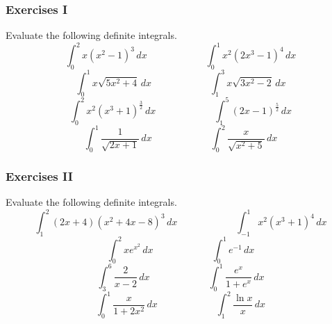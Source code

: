 \documentclass[xcolor=dvipsnames]{beamer}
\newcounter{exercise}
\begin{document}
\begin{frame}
  \frametitle{Exercises I}
Evaluate the following definite integrals.
\begin{equation}
  \label{eq:mauphouw}
  \int_{0}^{2}x(x^{2}-1)^{3}\,dx\hspace{1in}\int_{0}^{1}x^{2}(2x^{3}-1)^{4}\,dx
\end{equation}
\begin{equation}
  \label{eq:pahteeth}
  \int_{0}^{1}x\sqrt{5x^{2}+4}\,dx\hspace{1in}\int_{1}^{3}x\sqrt{3x^{2}-2}\,dx
\end{equation}
\begin{equation}
  \label{eq:ceiquoor}
  \int_{0}^{2}x^{2}(x^{3}+1)^{\frac{3}{2}}\,dx\hspace{1in}\int_{1}^{5}(2x-1)^{\frac{5}{2}}\,dx
\end{equation}
\begin{equation}
  \label{eq:riweevie}
  \int_{0}^{1}\frac{1}{\sqrt{2x+1}}\,dx\hspace{1in}\int_{0}^{2}\frac{x}{\sqrt{x^{2}+5}}\,dx
\end{equation}
\end{frame}

\begin{frame}
  \frametitle{Exercises II}
Evaluate the following definite integrals.
\begin{equation}
  \label{eq:aigighau}
  \int_{1}^{2}(2x+4)(x^{2}+4x-8)^{3}\,dx\hspace{1in}\int_{-1}^{1}x^{2}(x^{3}+1)^{4}\,dx
\end{equation}
\begin{equation}
  \label{eq:omixughu}
  \int_{0}^{2}xe^{x^{2}}\,dx\hspace{1in}\int_{0}^{1}e^{-1}\,dx
\end{equation}
\begin{equation}
  \label{eq:baemixeg}
  \int_{3}^{6}\frac{2}{x-2}\,dx\hspace{1in}\int_{0}^{1}\frac{e^{x}}{1+e^{x}}\,dx
\end{equation}
\begin{equation}
  \label{eq:aeteepah}
  \int_{0}^{1}\frac{x}{1+2x^{2}}\,dx\hspace{1in}\int_{1}^{2}\frac{\ln{}x}{x}\,dx
\end{equation}
\end{frame}
\end{document}
